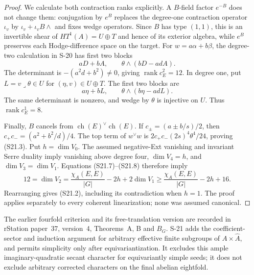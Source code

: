 \documentclass[11pt,a4paper]{article}
\theoremstyle{definition}
\begin{document}
\begin{proof}
We calculate both contraction ranks explicitly. A
$B$-field factor $e^{-B}$ does not change them:
conjugation by $e^B$ replaces the degree-one contraction
operator $\iota_v$ by $\iota_v+\iota_vB\wedge$ and fixes
wedge operators. Since $B$ has type $(1,1)$, this is an
invertible shear of $HT^1(A)=U\oplus T$ and hence of its
exterior algebra, while $e^B$ preserves each Hodge-difference
space on the target.
For $w=a\alpha+b\beta$, the degree-two calculation in S-20
has first two blocks
\[
 aD+bA,\qquad\theta\wedge(bD-adA).
\]
The determinant is $-(a^2d+b^2)\ne0$, giving
$\operatorname{rank}c_E^2=12$.
In degree one, put $L=v\mathbin{\lrcorner}\theta\in U$
for $(\eta,v)\in U\oplus T$.
The first two blocks are
\[
 a\eta+bL,\qquad\theta\wedge(b\eta-adL).
\]
The same determinant is nonzero, and wedge by $\theta$
is injective on $U$. Thus $\operatorname{rank}c_E^1=8$.

Finally, $B$ cancels from $\operatorname{ch}(E)^\vee
\operatorname{ch}(E)$. If
$c_\pm=(a\pm b/s)/2$, then
$c_+c_-=(a^2+b^2/d)/4$.
The top term of $w^\vee w$ is
$2c_+c_-(2s)^4\theta^4/24$, proving (S21.3).
Put $h=\dim V_0$. The assumed negative-Ext vanishing and
invariant Serre duality imply vanishing above degree four,
$\dim V_4=h$, and $\dim V_3=\dim V_1$.
Equations (S21.7)--(S21.8) therefore imply
\[
 12=\dim V_2
 =\frac{\chi_A(E,E)}{|G|}-2h+2\dim V_1
 \ge\frac{\chi_A(E,E)}{|G|}-2h+16.
\]
Rearranging gives (S21.2), including its contradiction
when $h=1$. The proof applies separately to every coherent
linearization; none was assumed canonical.
\end{proof}

The earlier fourfold criterion and its free-translation
version are recorded in rStation paper~37, version~4,
Theorems~A, B and $B_G$. S-21 adds the coefficient-sector
and induction argument for arbitrary effective finite
subgroups of $A\times\widehat A$, and permits simplicity
only after equivariantization. It excludes this ample
imaginary-quadratic secant character for equivariantly
simple seeds; it does not exclude arbitrary corrected
characters on the final abelian eightfold.
\end{document}
